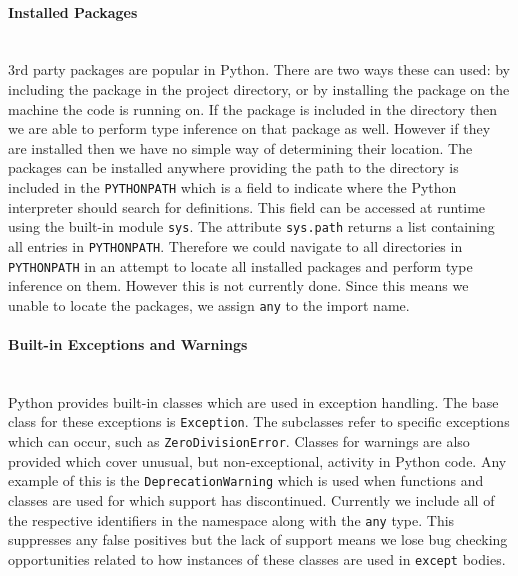 \documentclass[12pt, titlepage]{article}
\begin{document}
\paragraph*{Installed Packages}\mbox{} \\
3rd party packages are popular in Python. There are two ways these can used: by including the package in the project directory, or by installing the package on the machine the code is running on. If the package is included in the directory then we are able to perform type inference on that package as well. However if they are installed then we have no simple way of determining their location. The packages can be installed anywhere providing the path to the directory is included in the \texttt{PYTHONPATH} which is a field to indicate where the Python interpreter should search for definitions. This field can be accessed at runtime using the built-in module \texttt{sys}. The attribute \texttt{sys.path} returns a list containing all entries in \texttt{PYTHONPATH}. Therefore we could navigate to all directories in \texttt{PYTHONPATH} in an attempt to locate all installed packages and perform type inference on them. However this is not currently done. Since this means we unable to locate the packages, we assign \texttt{any} to the import name.

\paragraph*{Built-in Exceptions and Warnings} \mbox{} \\
Python provides built-in classes which are used in exception handling. The base class for these exceptions is \texttt{Exception}. The subclasses refer to specific exceptions which can occur, such as \texttt{ZeroDivisionError}. Classes for warnings are also provided which cover unusual, but non-exceptional, activity in Python code. Any example of this is the \texttt{DeprecationWarning} which is used when functions and classes are used for which support has discontinued. Currently we include all of the respective identifiers in the namespace along with the \texttt{any} type. This suppresses any false positives but the lack of support means we lose bug checking opportunities related to how instances of these classes are used in \texttt{except} bodies.
\end{document}
